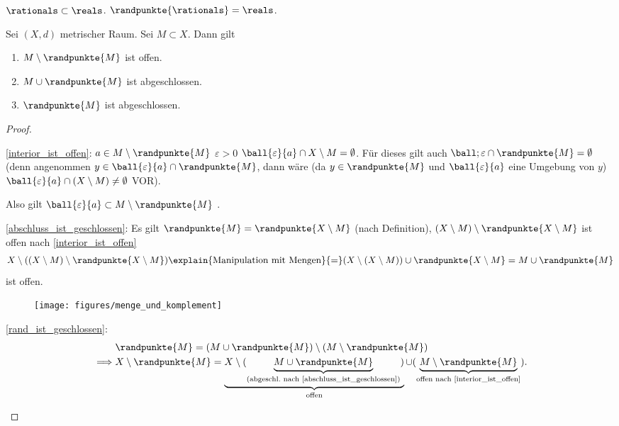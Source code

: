 \begin{beispiel*}
    \( \rationals\subset \reals \). \( \randpunkte{\rationals} =\reals\).
\end{beispiel*}
\begin{satz}
    Sei \( (X,d) \) metrischer Raum. Sei \( M\subset X \). Dann gilt
    \begin{enumerate}
        \item \label{interior_ist_offen}\( M\setminus \randpunkte{M} \) ist offen.
        \item \label{abschluss_ist_geschlossen}\( M\cup \randpunkte{M} \) ist abgeschlossen.
        \item \label{rand_ist_geschlossen}\( \randpunkte{M} \) ist abgeschlossen.
    \end{enumerate}
\end{satz}
\begin{proof}
    \begin{proofdescription}
        \item[\ref{interior_ist_offen}:] \( a\in M\setminus \randpunkte{M} \) \timplies \texists \( \varepsilon>0 \) \sd \( \ball{\varepsilon}{a}\cap X\setminus M = \emptyset \). Für dieses gilt auch \( \ball;{\varepsilon}\cap \randpunkte{M}=\emptyset\) (denn angenommen \texists \( y\in \ball{\varepsilon}{a} \cap \randpunkte{M} \),  dann wäre (da \( y\in \randpunkte{M} \) und \( \ball{\varepsilon}{a} \) eine Umgebung von \( y \)) \( \ball{\varepsilon}{a}\cap (X\setminus M)\neq \emptyset \) \contra \textsc{VOR}).
        
        Also gilt \( \ball{\varepsilon}{a}\subset M\setminus \randpunkte{M} \) \timplies \Beh.
        \item[\ref{abschluss_ist_geschlossen}:] Es gilt \( \randpunkte{M}=\randpunkte{X\setminus M} \) (nach Definition), \( (X\setminus M)\setminus \randpunkte{X\setminus M} \) ist offen nach \ref{interior_ist_offen} \timplies \begin{align*}
            X\setminus ((X\setminus M)\setminus \randpunkte{X\setminus M})\explain{\text{Manipulation mit Mengen}}{=}(X\setminus(X\setminus M))\cup \randpunkte{X\setminus M}=M\cup \randpunkte{M}
        \end{align*}
        ist offen.
        \begin{figure}[H]
            \centering
            \texttt{[image: figures/menge\_und\_komplement]}
            \label{fig:menge_und_komplement}
        \end{figure}
        \item[\ref{rand_ist_geschlossen}:]
        \begin{align*}
            &\randpunkte{M}=(M\cup \randpunkte{M})\setminus (M\setminus \randpunkte{M})\\
            \implies &X\setminus \randpunkte{M}=\underbrace{X\setminus(\underbrace{M\cup \randpunkte{M}}_{\text{(abgeschl.\ nach \ref{abschluss_ist_geschlossen})}})}_{\text{offen}}\cup (\underbrace{M\setminus \randpunkte{M}}_{\text{offen nach \ref{interior_ist_offen}}}).
        \end{align*} 
    \end{proofdescription}
\end{proof}

